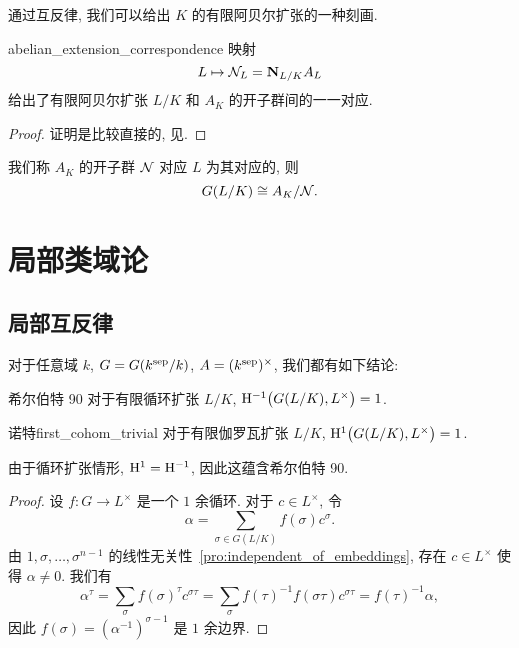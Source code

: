 通过互反律, 我们可以给出 $K$ 的有限阿贝尔扩张的一种刻画.

\begin{theorem}{}{abelian_extension_correspondence}
映射
  \[L\mapsto {\mathcal{N}}_L={\mathbf{N}}_{L/K}A_L\]
给出了有限阿贝尔扩张 $L/K$ 和 $A_K$ 的开子群间的一一对应.
\end{theorem}
\begin{proof}
证明是比较直接的, 见\cite[Theorem~4.6.7]{Neukirch1999}.
\end{proof}
我们称 $A_K$ 的开子群 ${\mathcal{N}}$ 对应 $L$ 为其对应的, 则
  \[G(L/K)\cong A_K/{\mathcal{N}}.\]


\section{局部类域论}
\label{sec:local class field theory}
\subsection{局部互反律}

对于任意域 $k$, $G=G(k^{\mathrm{sep}}/k)$, $A=(k^{\mathrm{sep}})^\times$, 我们都有如下结论:
\begin{theorem}{希尔伯特 90}{}
对于有限循环扩张 $L/K$, ${\mathrm{H}}^{-1}\bigl(G(L/K),L^\times\bigr)=1$.
\end{theorem}

\begin{proposition}{诺特}{first_cohom_trivial}
对于有限伽罗瓦扩张 $L/K$, ${\mathrm{H}}^1\bigl(G(L/K),L^\times\bigr)=1$.
\end{proposition}
由于循环扩张情形, ${\mathrm{H}}^1={\mathrm{H}}^{-1}$, 因此这蕴含希尔伯特 90.
\begin{proof}
设 $f:G\to L^\times$ 是一个 $1$ 余循环. 对于 $c\in L^\times$, 令
  \[\alpha=\sum_{\sigma\in G(L/K)} f(\sigma) c^\sigma.\]
由 $1,\sigma,\dots,\sigma^{n-1}$ 的线性无关性~\ref{pro:independent_of_embeddings}, 存在 $c\in L^\times$ 使得 $\alpha\neq 0$. 我们有
  \[\alpha^\tau=\sum_\sigma f(\sigma)^\tau c^{\sigma\tau}=\sum_\sigma f(\tau)^{-1}f(\sigma\tau)c^{\sigma\tau}=f(\tau)^{-1}\alpha,\]
因此 $f(\sigma)=(\alpha^{-1})^{\sigma-1}$ 是 $1$ 余边界.
\end{proof}

